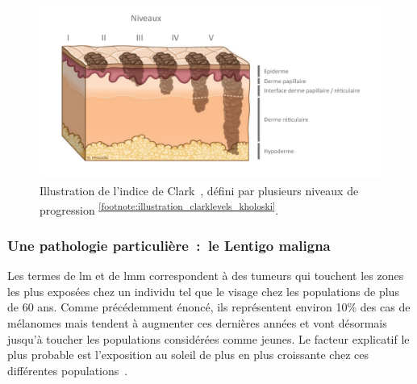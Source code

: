 \begin{figure}[H]
    \centering
    \includegraphics[width=0.9\linewidth]{contents/chapter_1/resources/illustration_clarklevels_kholoski.pdf}
    \caption{Illustration de l'indice de Clark~\cite{Clark1969}, défini par plusieurs niveaux de progression \textsuperscript{\ref{footnote:illustration_clarklevels_kholoski}}.}
    \label{fig:illustration_clarklevels_kholoski}
\end{figure}\par

\addtocounter{footnote}{1}

\subsubsection{Une pathologie particulière~:~le Lentigo maligna}
\label{subsec:lentigo}
Les termes de \acrfull{lm} et de \acrfull{lmm} correspondent à des tumeurs qui touchent les zones les plus exposées chez un individu tel que le visage chez les populations de plus de 60 ans. Comme précédemment énoncé, ils représentent environ 10\% des cas de mélanomes mais tendent à augmenter ces dernières années et vont désormais jusqu'à toucher les populations considérées comme jeunes. Le facteur explicatif le plus probable est l'exposition au soleil de plus en plus croissante chez ces différentes populations~\cite{Baccard2009, LeGal2011, LeDuff2014}.\par

